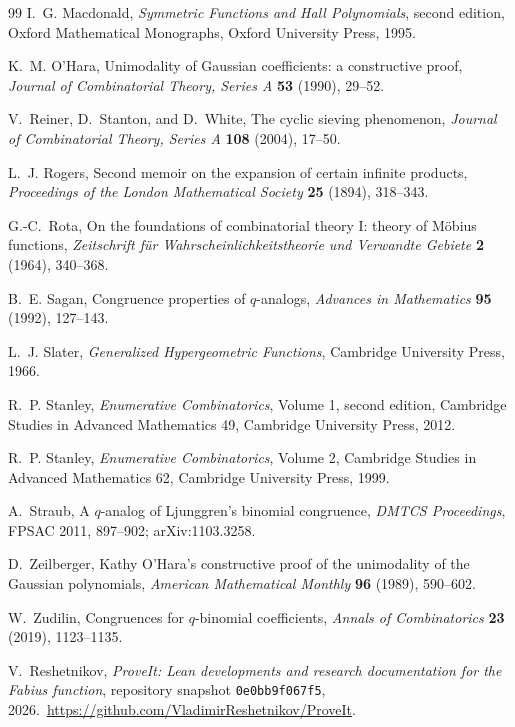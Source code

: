 \documentclass[11pt,oneside,openany]{book}
\theoremstyle{definition}
\theoremstyle{remark}
\begin{document}
\begin{thebibliography}{99}
I.~G. Macdonald,
\emph{Symmetric Functions and Hall Polynomials}, second edition,
Oxford Mathematical Monographs, Oxford University Press, 1995.

K.~M. O'Hara,
Unimodality of Gaussian coefficients: a constructive proof,
\emph{Journal of Combinatorial Theory, Series A} \textbf{53} (1990), 29--52.

V.~Reiner, D.~Stanton, and D.~White,
The cyclic sieving phenomenon,
\emph{Journal of Combinatorial Theory, Series A} \textbf{108} (2004), 17--50.

L.~J. Rogers,
Second memoir on the expansion of certain infinite products,
\emph{Proceedings of the London Mathematical Society} \textbf{25} (1894), 318--343.

G.-C.~Rota,
On the foundations of combinatorial theory I: theory of M\"obius functions,
\emph{Zeitschrift f\"ur Wahrscheinlichkeitstheorie und Verwandte Gebiete} \textbf{2} (1964), 340--368.

B.~E. Sagan,
Congruence properties of $q$-analogs,
\emph{Advances in Mathematics} \textbf{95} (1992), 127--143.

L.~J. Slater,
\emph{Generalized Hypergeometric Functions},
Cambridge University Press, 1966.

R.~P. Stanley,
\emph{Enumerative Combinatorics}, Volume 1, second edition,
Cambridge Studies in Advanced Mathematics 49, Cambridge University Press, 2012.

R.~P. Stanley,
\emph{Enumerative Combinatorics}, Volume 2,
Cambridge Studies in Advanced Mathematics 62, Cambridge University Press, 1999.

A.~Straub,
A $q$-analog of Ljunggren's binomial congruence,
\emph{DMTCS Proceedings}, FPSAC 2011, 897--902; arXiv:1103.3258.

D.~Zeilberger,
Kathy O'Hara's constructive proof of the unimodality of the Gaussian polynomials,
\emph{American Mathematical Monthly} \textbf{96} (1989), 590--602.

W.~Zudilin,
Congruences for $q$-binomial coefficients,
\emph{Annals of Combinatorics} \textbf{23} (2019), 1123--1135.

V.~Reshetnikov,
\emph{ProveIt: Lean developments and research documentation for the Fabius
function}, repository snapshot \texttt{0e0bb9f067f5}, 2026.\
\url{https://github.com/VladimirReshetnikov/ProveIt}.

\end{thebibliography}

\printindex
\end{document}
